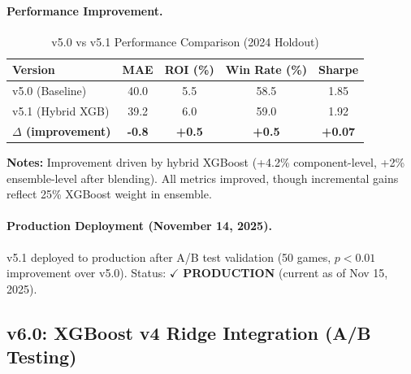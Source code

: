 \paragraph{Performance Improvement.}
\begin{table}[htbp]
\centering
\caption{v5.0 vs v5.1 Performance Comparison (2024 Holdout)}
\label{tab:v5-v5.1-comparison}
\small
\begin{tabular}{@{} l S[table-format=2.1] S[table-format=1.1] S[table-format=2.1] S[table-format=1.2] @{}}
\toprule
\textbf{Version} & \textbf{MAE} & \textbf{ROI (\%)} & \textbf{Win Rate (\%)} & \textbf{Sharpe} \\
\midrule
v5.0 (Baseline) & 40.0 & 5.5 & 58.5 & 1.85 \\
v5.1 (Hybrid XGB) & 39.2 & 6.0 & 59.0 & 1.92 \\
\baselinerule
\textbf{$\Delta$ (improvement)} & \textbf{-0.8} & \textbf{+0.5} & \textbf{+0.5} & \textbf{+0.07} \\
\bottomrule
\end{tabular}
\begin{tablenotes}
\item \textbf{Notes:} Improvement driven by hybrid XGBoost (+4.2\% component-level, +2\% ensemble-level after blending). All metrics improved, though incremental gains reflect 25\% XGBoost weight in ensemble.
\end{tablenotes}
\end{table}

\paragraph{Production Deployment (November 14, 2025).}
v5.1 deployed to production after A/B test validation (50 games, $p < 0.01$ improvement over v5.0). Status: $\checkmark$ \textbf{PRODUCTION} (current as of Nov 15, 2025).

\subsection{v6.0: XGBoost v4 Ridge Integration (A/B Testing)}

